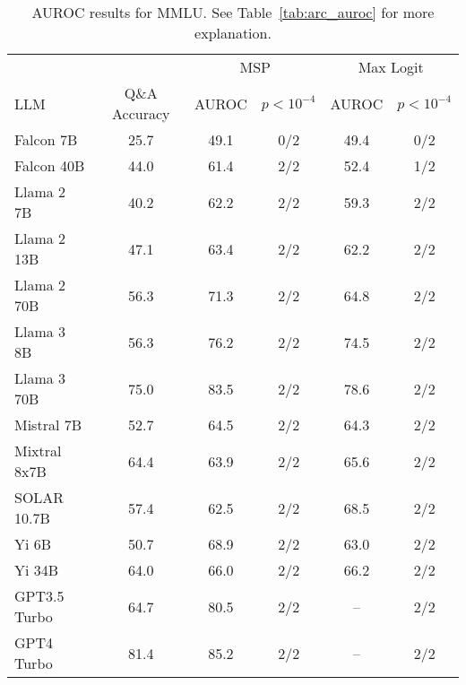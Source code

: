 \begin{table*}[h]
\centering
\caption{AUROC results for MMLU. See Table~\ref{tab:arc_auroc} for more explanation.}
\label{tab:mmlu_auroc}
\begin{tabular}{lccccc}
\toprule
& & \multicolumn{2}{c}{MSP} & \multicolumn{2}{c}{Max Logit} \\ 
LLM & Q\&A Accuracy & AUROC & $p < 10^{-4}$ & AUROC & $p < 10^{-4}$ \\ 
\cmidrule(lr){1-1} \cmidrule(lr){2-2} \cmidrule(lr){3-4} \cmidrule(lr){5-6} 
Falcon 7B & 25.7 & 49.1 & 0/2 & 49.4 & 0/2\\
Falcon 40B & 44.0 & 61.4 & 2/2 & 52.4 & 1/2\\
Llama 2 7B & 40.2 & 62.2 & 2/2 & 59.3 & 2/2\\
Llama 2 13B & 47.1 & 63.4 & 2/2 & 62.2 & 2/2\\
Llama 2 70B & 56.3 & 71.3 & 2/2 & 64.8 & 2/2\\
Llama 3 8B & 56.3 & 76.2 & 2/2 & 74.5 & 2/2\\
Llama 3 70B & 75.0 & 83.5 & 2/2 & 78.6 & 2/2\\
Mistral 7B & 52.7 & 64.5 & 2/2 & 64.3 & 2/2\\
Mixtral 8x7B & 64.4 & 63.9 & 2/2 & 65.6 & 2/2\\
SOLAR 10.7B & 57.4 & 62.5 & 2/2 & 68.5 & 2/2\\
Yi 6B & 50.7 & 68.9 & 2/2 & 63.0 & 2/2\\
Yi 34B & 64.0 & 66.0 & 2/2 & 66.2 & 2/2\\
GPT3.5 Turbo & 64.7 & 80.5 & 2/2 & -- & 2/2\\
GPT4 Turbo & 81.4 & 85.2 & 2/2 & -- & 2/2\\
\bottomrule
\end{tabular}
\end{table*}
